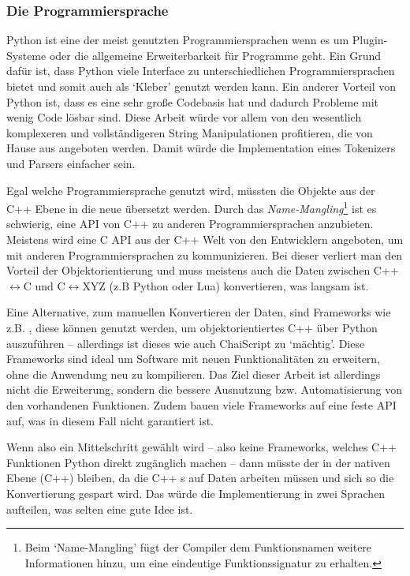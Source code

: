     \subsubsection{Die Programmiersprache}
    \label{sssec:Die Programmiersprache}
      Python ist eine der meist genutzten Programmiersprachen wenn es um Plugin-Systeme oder die allgemeine Erweiterbarkeit für Programme geht. Ein Grund dafür ist, dass Python viele Interface zu unterschiedlichen Programmiersprachen bietet und somit auch als `Kleber' genutzt werden kann. Ein anderer Vorteil von Python ist, dass es eine sehr große Codebasis hat und dadurch Probleme mit wenig Code lösbar sind. Diese Arbeit würde vor allem von den wesentlich komplexeren und vollständigeren String Manipulationen profitieren, die von Hause aus angeboten werden. Damit würde die Implementation eines Tokenizers und Parsers einfacher sein.

      Egal welche Programmiersprache genutzt wird, müssten die Objekte aus der C++ Ebene in die neue übersetzt werden. Durch das \emph{Name-Mangling}\footnote{
        Beim `Name-Mangling' fügt der Compiler dem Funktionsnamen weitere Informationen hinzu, um eine eindeutige Funktionssignatur zu erhalten.
      } ist es schwierig, eine API von C++ zu anderen Programmiersprachen anzubieten. Meistens wird eine C API aus der C++ Welt von den Entwicklern angeboten, um mit anderen Programmiersprachen zu kommunizieren. Bei dieser verliert man den Vorteil der Objektorientierung und muss meistens auch die Daten zwischen C++$\longleftrightarrow$C und C$\longleftrightarrow$XYZ (z.B Python oder Lua) konvertieren, was langsam ist.

      Eine Alternative, zum manuellen Konvertieren der Daten, sind Frameworks wie z.B. , diese können genutzt werden, um objektorientiertes C++ über Python auszuführen -- allerdings ist dieses wie auch ChaiScript zu `mächtig'. Diese Frameworks sind ideal um Software mit neuen Funktionalitäten zu erweitern, ohne die Anwendung neu zu kompilieren. Das Ziel dieser Arbeit ist allerdings nicht die Erweiterung, sondern die bessere Ausnutzung bzw. Automatisierung von den vorhandenen Funktionen. Zudem bauen viele Frameworks auf eine feste API auf, was in diesem Fall nicht garantiert ist.

      Wenn also ein Mittelschritt gewählt wird -- also keine Frameworks, welches C++ Funktionen Python direkt zugänglich machen -- dann müsste der  in der nativen Ebene (C++) bleiben, da die C++ s auf Daten arbeiten müssen und sich so die Konvertierung gespart wird. Das würde die Implementierung in zwei Sprachen aufteilen, was selten eine gute Idee ist.

